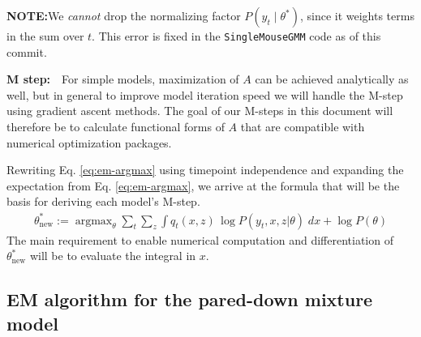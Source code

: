 \documentclass{article}         %
\DeclareMathOperator{\argmax}{\arg\max}
\begin{document}
\textbf{NOTE:}\quad We \textit{cannot} drop the normalizing factor $P(y_t\mid \theta^*)$, since it weights terms in the sum over $t$. This error is fixed in the \texttt{SingleMouseGMM} code as of this commit.

\textbf{M step:}\ \ For simple models, maximization of $A$ can be achieved analytically as well, but in general to improve model iteration speed we will handle the M-step using gradient ascent methods. The goal of our M-steps in this document will therefore be to calculate functional forms of $A$ that are compatible with numerical optimization packages.

Rewriting Eq. \ref{eq:em-argmax} using timepoint independence and expanding the expectation from Eq. \ref{eq:em-argmax}, we arrive at the formula that will be the basis for deriving each model's M-step.
\begin{align}
    \theta^*_{\text{new}} := \argmax_{\theta} \sum_t \sum_{z} \int q_t(x, z)\, \log P(y_t, x, z | \theta) \; dx + \log P(\theta)\label{eq:em-int-argmax}
\end{align}
The main requirement to enable numerical computation and differentiation of $\theta^*_{\text{new}}$ will be to evaluate the integral in $x$. 


\subsection{EM algorithm for the pared-down mixture model}
\label{sec:em-results-pared-down}
\end{document}
